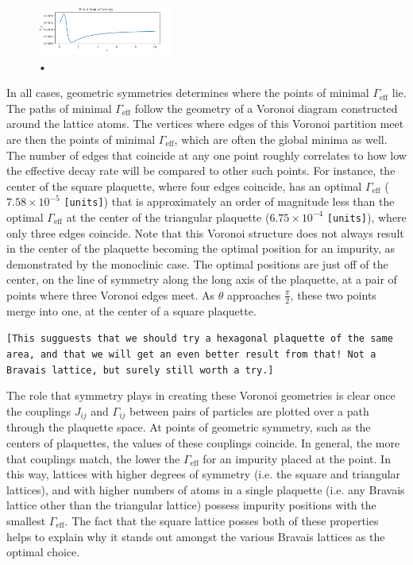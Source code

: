 \documentclass[aps,pra,superscriptaddress,twocolumn]{revtex4-1}
\newcommand{\commentSB}[1]{\texttt{\color{blue}[#1]}}
\begin{document}
\begin{figure}
    \centering
    \includegraphics[width=0.4\textwidth]{figures/temp_delta_check_cropped.png} 
    \caption{•}
    \label{fig:delta_check}
\end{figure}

In all cases, geometric symmetries determines where the points of minimal $\Gamma_\text{eff}$ lie. The paths of minimal $\Gamma_\text{eff}$ follow the geometry of a Voronoi diagram constructed around the lattice atoms. The vertices where edges of this Voronoi partition meet are then the points of minimal $\Gamma_\text{eff}$, which are often the global minima as well. The number of edges that coincide at any one point roughly correlates to how low the effective decay rate will be compared to other such points. For instance, the center of the square plaquette, where four edges coincide, has an optimal $\Gamma_\text{eff}$ ($7.58\times 10^{-5}$ \commentSB{units}) that is approximately an order of magnitude less than the optimal $\Gamma_\text{eff}$ at the center of the triangular plaquette ($6.75\times 10^{-4}$ \commentSB{units}), where only three edges coincide. Note that this Voronoi structure does not always result in the center of the plaquette becoming the optimal position for an impurity, as demonstrated by the monoclinic case. The optimal positions are just off of the center, on the line of symmetry along the long axis of the plaquette, at a pair of points where three Voronoi edges meet. As $\theta$ approaches $\frac{\pi}{2}$, these two points merge into one, at the center of a square plaquette.

\commentSB{This sugguests that we should try a hexagonal plaquette of the same area, and that we will get an even better result from that! Not a Bravais lattice, but surely still worth a try.}

The role that symmetry plays in creating these Voronoi geometries is clear once the couplings $J_{ij}$ and $\Gamma_{ij}$ between pairs of particles are plotted over a path through the plaquette space. At points of geometric symmetry, such as the centers of plaquettes, the values of these couplings coincide. In general, the more that couplings match, the lower the $\Gamma_\text{eff}$ for an impurity placed at the point. In this way, lattices with higher degrees of symmetry (i.e. the square and triangular lattices), and with higher numbers of atoms in a single plaquette (i.e. any Bravais lattice other than the triangular lattice) possess impurity positions with the smallest $\Gamma_\text{eff}$. The fact that the square lattice posses both of these properties helps to explain why it stands out amongst the various Bravais lattices as the optimal choice. 
\end{document}
